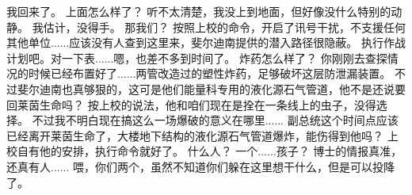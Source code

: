 \documentclass[openany]{book}
\begin{document}
\begin{dialogue}
     我回来了。
     上面怎么样了？
     听不太清楚，我没上到地面，但好像没什么特别的动静。
     我估计，没得手。
     那我们？
     按照上校的命令，开启了讯号干扰，不支援任何其他单位......应该没有人查到这里来，斐尔迪南提供的潜入路径很隐蔽。
     执行作战计划吧。对一下表......嗯，也差不多到时间了。
     炸药怎么样了？
     你刚刚去查探情况的时候已经布置好了......两管改造过的塑性炸药，足够破坏这层防泄漏装置。
     不过斐尔迪南也真够狠的，这可是他们能量科专用的液化源石气管道，他不是还说要回莱茵生命吗？
     按上校的说法，他和咱们现在是拴在一条线上的虫子，没得选择。
     不过我不明白现在搞这么一场爆破的意义在哪里......
     副总统这个时间点应该已经离开莱茵生命了，大楼地下结构的液化源石气管道爆炸，能伤得到他吗？
     上校自有他的安排，执行命令就好了。
     什么人？
     一个......孩子？
     博士的情报真准，还真有人......
     喂，你们两个，虽然不知道你们躲在这里想干什么，但是可以投降了。
\end{dialogue}
\end{document}
